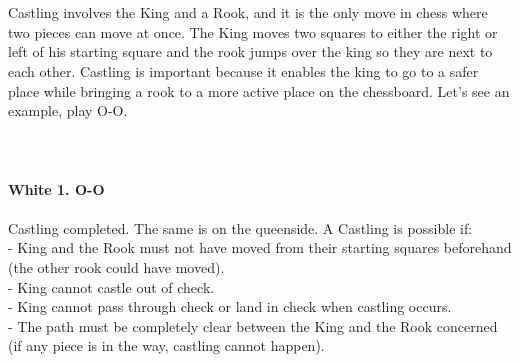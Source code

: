 \documentclass{article}
\begin{document}

\\
\\
Castling involves the King and a Rook, and it is the only move in chess where two pieces can move at once. The King moves two squares to either the right or left of his starting square and the rook jumps over the king so they are next to each other. Castling is important because it enables the king to go to a safer place while bringing a rook to a more active place on the chessboard. Let's see an example, play O-O.\\
\\

\\
\\
\textbf{White 1. O-O}\\
\\
Castling completed. The same is on the queenside. A Castling is possible if:\\- King and the Rook must not have moved from their starting squares beforehand (the other rook could have moved).\\- King cannot castle out of check.\\- King cannot pass through check or land in check when castling occurs.\\- The path must be completely clear between the King and the Rook concerned (if any piece is in the way, castling cannot happen).
\end{document}

